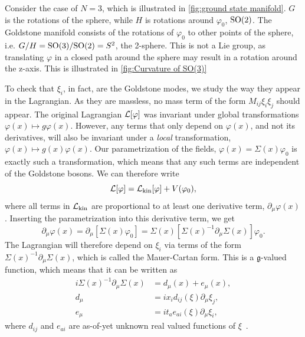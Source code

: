 Consider the case of $N = 3$, which is illustrated in \autoref{fig:ground state manifold}.
$G$ is the rotations of the sphere, while $H$ is rotations around $\varphi_0$, $\text{SO}(2)$.
The Goldstone manifold consists of the rotations of $\varphi_0$ to other points of the sphere, i.e. $G/H = \text{SO}(3)/\text{SO}(2) = S^2$, the 2-sphere.
This is not a Lie group, as translating $\varphi$ in a closed path around the sphere may result in a rotation around the z-axis.
This is illustrated in \autoref{fig:Curvature of SO(3)}


To check that $\xi_i$, in fact, are the Goldstone modes, we study the way they appear in the Lagrangian.
As they are massless, no mass term of the form $M_{ij} \xi_i \xi_j$ should appear.
The original Lagrangian $\mathcal{L}[\varphi]$ was invariant under global transformations $\varphi(x) \mapsto g \varphi(x)$.
However, any terms that only depend on $\varphi(x)$, and not its derivatives, will also be invariant under a \emph{local} transformation, $\varphi(x) \mapsto g(x)\varphi(x)$.
Our parametrization of the fields, $\varphi(x) = \Sigma(x)\varphi_0$ is exactly such a transformation, which means that any such terms are independent of the Goldstone bosons.
We can therefore write
\begin{equation}
    \mathcal{L}[\varphi] = \mathcal{L}_{\mathrm{kin}}[\varphi] + V(\varphi_0),
\end{equation}
%
where all terms in $\mathcal{L}_{\mathrm{kin}}$ are proportional to at least one derivative term, $\partial_\mu \varphi(x)$.
Inserting the parametrization into this derivative term, we get
\begin{equation}
    \partial_\mu \varphi(x) = \partial_\mu [\Sigma(x) \varphi_0]
    = \Sigma(x) [\Sigma(x)^{-1} \partial_{\mu} \Sigma(x)] \varphi_0.
\end{equation}
%
The Lagrangian will therefore depend on $\xi_i$ via terms of the form $\Sigma(x)^{-1}\partial_\mu \Sigma(x)$, which is called the Mauer-Cartan form.
This is a $\mathfrak g$-valued function, which means that it can be written as
\begin{align}
    i\Sigma(x)^{-1}\partial_\mu \Sigma(x) & 
    = d_{\mu}(x) + e_{\mu}(x), \\
    d_{\mu} & = i x_i d_{ij}(\xi) \partial_\mu \xi_j, \\
    e_{\mu} & = i t_a e_{ai}(\xi)\partial_\mu \xi_i,
\end{align}
%
where $d_{ij}$ and $e_{ai}$ are as-of-yet unknown real valued functions of $\xi$~\autocite{watanabeEffectiveLagrangianNonrelativistic2014,weinbergQuantumTheoryFields1996}.

